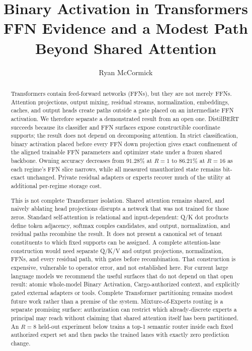 \documentclass[11pt]{article}
\title{\textbf{Binary Activation in Transformers}\\
\large FFN Evidence and a Modest Path Beyond Shared Attention}
\author[1]{Ryan McCormick}
\affil[1]{Independent Researcher}
\begin{document}
\maketitle

\begin{abstract}
Transformers contain feed-forward networks (FFNs), but they are not merely
FFNs. Attention projections, output mixing, residual streams, normalization,
embeddings, caches, and output heads create paths outside a gate placed on an
intermediate FFN activation. We therefore separate a demonstrated result from
an open one. DistilBERT succeeds because its classifier and FFN surfaces expose
constructible coordinate supports; the result does not depend on decomposing
attention. In strict classification, binary activation placed before
every FFN down projection gives exact confinement of the aligned trainable FFN
parameters and optimizer state under a frozen shared backbone. Owning accuracy
decreases from $91.28\%$ at $R=1$ to $86.21\%$ at $R=16$ as each regime's FFN
slice narrows, while all measured unauthorized state remains bit-exact
unchanged. Private residual adapters or experts recover much of the utility at
additional per-regime storage cost.

This is not complete Transformer isolation. Shared attention remains shared,
and naively ablating head projections disrupts a network that was not trained
for those zeros. Standard self-attention is relational and input-dependent:
Q/K dot products define token adjacency, softmax couples candidates, and output,
normalization, and residual paths recombine the result. It does not present a
canonical set of tenant constituents to which fixed supports can be assigned.
A complete attention-lane construction would need separate
Q/K/V and output projections, normalization, FFNs, and every residual path,
with gates before recombination. That construction is expensive, vulnerable to
operator error, and not established here. For current large language models we
recommend the useful surfaces that do not depend on that open result: atomic
whole-model Binary Activation, Cargo-authorized context, and explicitly gated
external adapters or tools. Complete Transformer partitioning remains modest
future work rather than a premise of the system.
Mixture-of-Experts routing is a separate promising surface: authorization can
restrict which already-discrete experts a principal may reach without claiming
that shared attention itself has been partitioned. An $R=8$ held-out experiment
below trains a top-1 semantic router inside each fixed authorized expert set and
then packs the trained lanes with exactly zero prediction change.
\end{abstract}
\end{document}
